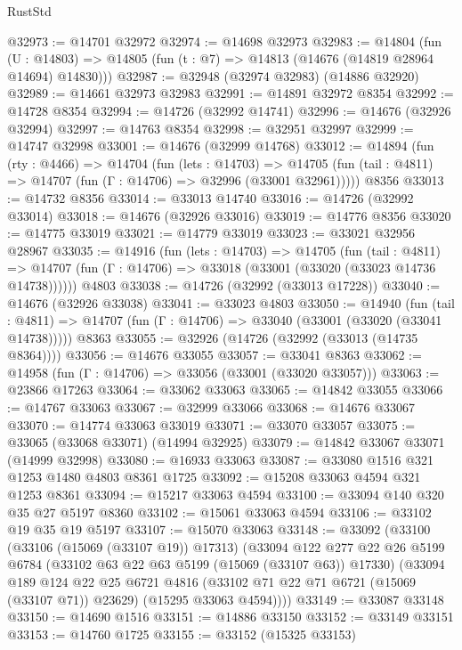 \begin{lexlean}{RustStd}
\begin{coremodule}
@32973 := @14701 @32972
@32974 := @14698 @32973
@32983 := @14804
    (fun (U : @14803) => @14805 (fun (t : @7) => @14813 (@14676 (@14819 @28964 @14694) @14830)))
@32987 := @32948 (@32974 @32983) (@14886 @32920)
@32989 := @14661 @32973 @32983
@32991 := @14891 @32972 @8354
@32992 := @14728 @8354
@32994 := @14726 (@32992 @14741)
@32996 := @14676 (@32926 @32994)
@32997 := @14763 @8354
@32998 := @32951 @32997
@32999 := @14747 @32998
@33001 := @14676 (@32999 @14768)
@33012 := @14894
    (fun (rty : @4466) =>
    @14704
      (fun (lets : @14703) =>
      @14705 (fun (tail : @4811) => @14707 (fun (Γ : @14706) => @32996 (@33001 @32961)))))
    @8356
@33013 := @14732 @8356
@33014 := @33013 @14740
@33016 := @14726 (@32992 @33014)
@33018 := @14676 (@32926 @33016)
@33019 := @14776 @8356
@33020 := @14775 @33019
@33021 := @14779 @33019
@33023 := @33021 @32956 @28967
@33035 := @14916
    (fun (lets : @14703) =>
    @14705
      (fun (tail : @4811) =>
      @14707 (fun (Γ : @14706) => @33018 (@33001 (@33020 (@33023 @14736 @14738))))))
    @4803
@33038 := @14726 (@32992 (@33013 @17228))
@33040 := @14676 (@32926 @33038)
@33041 := @33023 @4803
@33050 := @14940
    (fun (tail : @4811) => @14707 (fun (Γ : @14706) => @33040 (@33001 (@33020 (@33041 @14738)))))
    @8363
@33055 := @32926 (@14726 (@32992 (@33013 (@14735 @8364))))
@33056 := @14676 @33055
@33057 := @33041 @8363
@33062 := @14958 (fun (Γ : @14706) => @33056 (@33001 (@33020 @33057)))
@33063 := @23866 @17263
@33064 := @33062 @33063
@33065 := @14842 @33055
@33066 := @14767 @33063
@33067 := @32999 @33066
@33068 := @14676 @33067
@33070 := @14774 @33063 @33019
@33071 := @33070 @33057
@33075 := @33065 (@33068 @33071) (@14994 @32925)
@33079 := @14842 @33067 @33071 (@14999 @32998)
@33080 := @16933 @33063
@33087 := @33080 @1516 @321 @1253 @1480 @4803 @8361 @1725
@33092 := @15208 @33063 @4594 @321 @1253 @8361
@33094 := @15217 @33063 @4594
@33100 := @33094 @140 @320 @35 @27 @5197 @8360
@33102 := @15061 @33063 @4594
@33106 := @33102 @19 @35 @19 @5197
@33107 := @15070 @33063
@33148 := @33092
    (@33100
      (@33106 (@15069 (@33107 @19)) @17313)
      (@33094
        @122
        @277
        @22
        @26
        @5199
        @6784
        (@33102 @63 @22 @63 @5199 (@15069 (@33107 @63)) @17330)
        (@33094
          @189
          @124
          @22
          @25
          @6721
          @4816
          (@33102 @71 @22 @71 @6721 (@15069 (@33107 @71)) @23629)
          (@15295 @33063 @4594))))
@33149 := @33087 @33148
@33150 := @14690 @1516
@33151 := @14886 @33150
@33152 := @33149 @33151
@33153 := @14760 @1725
@33155 := @33152 (@15325 @33153)

\end{coremodule}
\end{lexlean}
